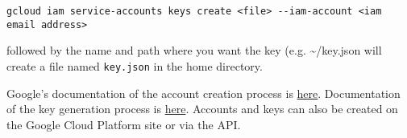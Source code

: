 \begin{lstlisting}
gcloud iam service-accounts keys create <file> --iam-account <iam email address>
\end{lstlisting}

followed by the name and path where you want the key (e.g.
\textasciitilde{}/key.json will create a file named \texttt{key.json} in
the home directory.

Google's documentation of the account creation process is
\href{https://cloud.google.com/iam/docs/creating-managing-service-accounts}{here}.
Documentation of the key generation process is
\href{https://cloud.google.com/iam/docs/creating-managing-service-account-keys}{here}.
Accounts and keys can also be created on the Google Cloud Platform site
or via the API.

